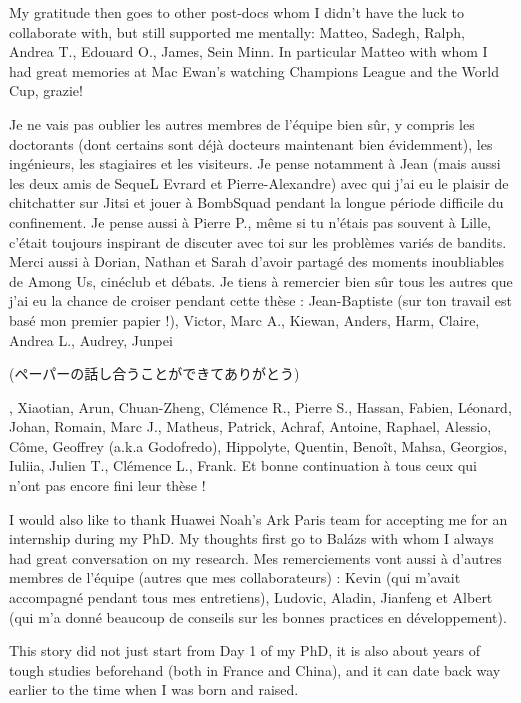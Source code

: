 My gratitude then goes to other post-docs whom I didn't have the luck to collaborate with, but still supported me mentally: Matteo, Sadegh, Ralph, Andrea T., Edouard O., James, Sein Minn. In particular Matteo with whom I had great memories at Mac Ewan's watching Champions League and the World Cup, grazie!

Je ne vais pas oublier les autres membres de l'\'equipe bien s\^ur, y compris les doctorants (dont certains sont d\'ej\`a docteurs maintenant bien \'evidemment), les ing\'enieurs, les stagiaires et les visiteurs. Je pense notamment \`a Jean (mais aussi les deux amis de SequeL Evrard et Pierre-Alexandre) avec qui j'ai eu le plaisir de chitchatter sur Jitsi et jouer \`a BombSquad pendant la longue p\'eriode difficile du confinement. Je pense aussi \`a Pierre P., m\^eme si tu n'\'etais pas souvent \`a Lille, c'\'etait toujours inspirant de discuter avec toi sur les probl\`emes vari\'es de bandits. Merci aussi \`a Dorian, Nathan et Sarah d'avoir partag\'e des moments inoubliables de Among Us, cin\'eclub et d\'ebats. Je tiens \`a remercier bien s\^ur tous les autres que j'ai eu la chance de croiser pendant cette th\`ese : Jean-Baptiste (sur ton travail est bas\'e mon premier papier !), Victor, Marc A., Kiewan, Anders, Harm, Claire, Andrea L., Audrey, Junpei \begin{CJK*}{UTF8}{gbsn}(ペーパーの話し合うことができてありがとう)\end{CJK*}, Xiaotian, Arun, Chuan-Zheng, Cl\'emence R., Pierre S., Hassan, Fabien, L\'eonard, Johan, Romain, Marc J., Matheus, Patrick, Achraf, Antoine, Raphael, Alessio, C\^ome, Geoffrey (a.k.a Godofredo), Hippolyte, Quentin, Beno\^it, Mahsa, Georgios, Iuliia, Julien T., Cl\'emence L., Frank. Et bonne continuation \`a tous ceux qui n'ont pas encore fini leur th\`ese !

I would also like to thank Huawei Noah's Ark Paris team for accepting me for an internship during my PhD. My thoughts first go to Bal\'azs with whom I always had great conversation on my research. Mes remerciements vont aussi \`a d'autres membres de l'\'equipe (autres que mes collaborateurs) : Kevin (qui m'avait accompagn\'e pendant tous mes entretiens), Ludovic, Aladin, Jianfeng et Albert (qui m'a donn\'e beaucoup de conseils sur les bonnes practices en d\'eveloppement). 

This story did not just start from Day 1 of my PhD, it is also about years of tough studies beforehand (both in France and China), and it can date back way earlier to the time when I was born and raised.

